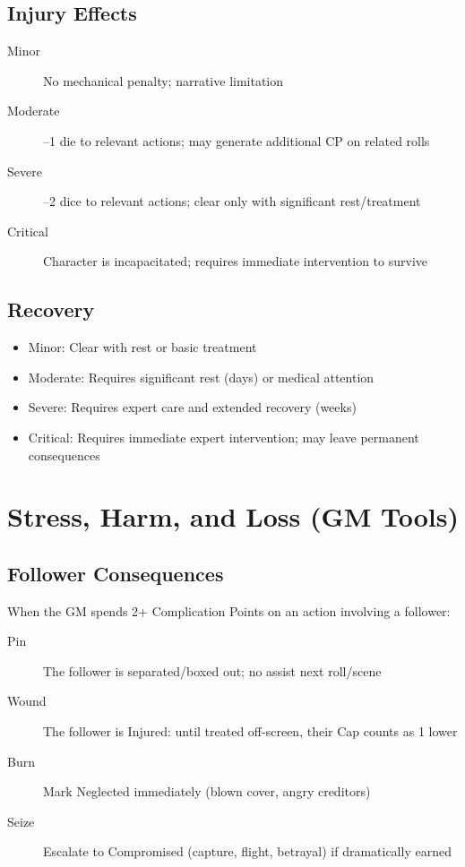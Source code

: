 \subsection{Injury Effects}

\begin{description}
\item[Minor] No mechanical penalty; narrative limitation
\item[Moderate] --1 die to relevant actions; may generate additional CP on related rolls
\item[Severe] --2 dice to relevant actions; clear only with significant rest/treatment
\item[Critical] Character is incapacitated; requires immediate intervention to survive
\end{description}

\subsection{Recovery}

\begin{itemize}
\item Minor: Clear with rest or basic treatment
\item Moderate: Requires significant rest (days) or medical attention
\item Severe: Requires expert care and extended recovery (weeks)
\item Critical: Requires immediate expert intervention; may leave permanent consequences
\end{itemize}

\section{Stress, Harm, and Loss (GM Tools)}

\subsection{Follower Consequences}

When the GM spends 2+ Complication Points on an action involving a follower:

\begin{description}
\item[Pin] The follower is separated/boxed out; no assist next roll/scene
\item[Wound] The follower is Injured: until treated off-screen, their Cap counts as 1 lower
\item[Burn] Mark Neglected immediately (blown cover, angry creditors)
\item[Seize] Escalate to Compromised (capture, flight, betrayal) if dramatically earned
\end{description}

